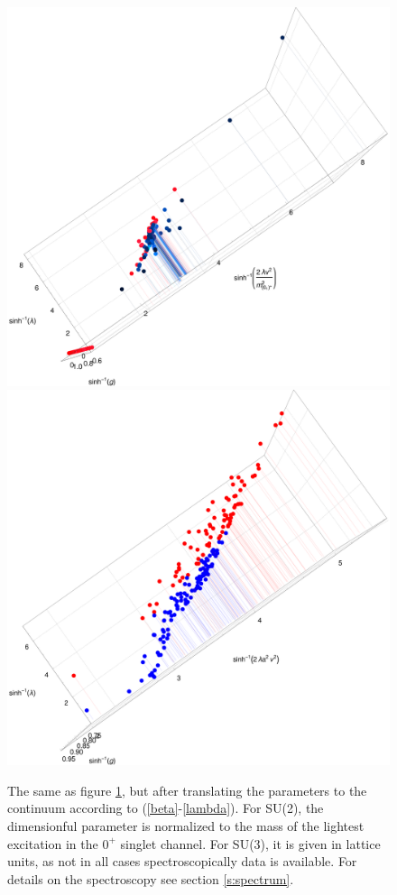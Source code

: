 \documentclass[final,12pt,3p,longtitle]{elsarticle}
\newcommand*{\prefr}[2]{(\ref{#1}-\ref{#2})}
\newcommand*{\1}{1\!\!\!\bot}
\begin{document}
\begin{figure}[!htbp]
\vspace{-4cm}
\includegraphics[width=0.95\linewidth]{lcp-su2-cont}\\[-0.5cm]
\includegraphics[width=0.95\linewidth]{lcp-su3-cont}\\[-0cm]
\caption{\label{fig:gdpdc}The same as figure \ref{fig:gdpdc}, but after translating the parameters to the continuum according to \prefr{beta}{lambda}. For SU(2), the dimensionful parameter is normalized  to the mass of the lightest excitation in the $0^+$ singlet channel. For SU(3), it is given in lattice units, as not in all cases spectroscopically data is available. For details on the spectroscopy see section \ref{s:spectrum}.}
\end{figure}
\end{document}
